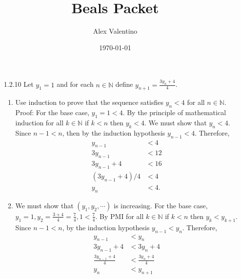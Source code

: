 \documentclass[12pt, letterpaper]{article}
\date{\today}
\author{Alex Valentino}
\title{Beals Packet}
\newcommand{\N}{\mathbb{N}}
\begin{document}
	\begin{enumerate}
		\item[1.2.10]Let $y_1 = 1$ and for each $n \in \N$ define $y_{n+1} = \frac{3y_n + 4}{4}$.
	\begin{enumerate}
		\item Use induction to prove that the sequence satisfies $y_n < 4$ for all $n \in \N$.\\
		Proof:  For the base case, $y_1 = 1 < 4$.  By the principle of mathematical induction for all $k \in \N$ if $k < n$ then $y_k < 4$.  We must show that $y_n < 4$.  Since $n-1 < n$, then by the induction hypothesis $y_{n-1} < 4$.  Therefore, 
		\begin{align*}
			y_{n-1} &< 4\\
			3 y_{n-1} &< 12\\ 
			3 y_{n-1} + 4 &< 16\\ 
			(3 y_{n-1} + 4)/4 &< 4\\ 
			y_n &< 4.
		\end{align*}
		\item We must show that $(y_1,y_2,\cdots)$ is increasing.  For the base case, $y_1 = 1, y_2 = \frac{3 + 4}{4} = \frac{7}{4}, 1 < \frac{7}{4}$.  By PMI for all $k \in \N $ if $k < n$ then $y_k < y_{k+1}$.  Since $n-1 < n$, by the induction hypothesis $y_{n-1} < y_{n}$.  Therefore, 
		\begin{align*}
		y_{n-1} &< y_{n}\\	
		3 y_{n-1} + 4 &< 3 y_{n} + 4\\
		\frac{3 y_{n-1} + 4}{4} &< \frac{3 y_{n} + 4}{4}\\
		y_n &< y_{n+1}	
\end{align*}			
	\end{enumerate}		
	
	\end{enumerate}
\end{document}
